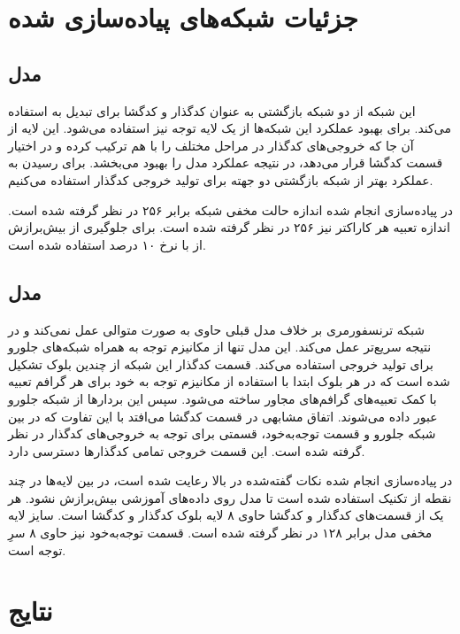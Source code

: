 \documentclass[12pt, a4paper]{book}
\begin{document}
\section*{جزئیات شبکه‌های پیاده‌سازی شده}

\subsection*{مدل }

این شبکه از دو شبکه بازگشتی  به عنوان کدگذار و کدگشا
برای تبدیل  به  استفاده می‌کند.
برای بهبود عملکرد این شبکه‌ها از یک لایه توجه نیز استفاده می‌شود. این لایه از آن جا که خروجی‌های کدگذار‌
در مراحل مختلف را با هم ترکیب کرده و در اختیار قسمت کدگشا قرار می‌دهد، در نتیجه عملکرد مدل را بهبود می‌بخشد.
برای رسیدن به عملکرد بهتر از شبکه بازگشتی دو جهته برای تولید خروجی کدگذار استفاده می‌کنیم.

در پیاده‌سازی انجام شده اندازه حالت مخفی شبکه  برابر ۲۵۶ در نظر گرفته شده است. اندازه
تعبیه هر کاراکتر نیز ۲۵۶ در نظر گرفته شده است. برای جلوگیری از بیش‌برازش از  با نرخ
۱۰ درصد استفاده شده است.

\subsection*{مدل }

شبکه ترنسفورمری بر خلاف مدل قبلی حاوی به صورت متوالی عمل نمی‌کند و در نتیجه سریع‌تر عمل می‌کند.
این مدل تنها از مکانیزم توجه به همراه شبکه‌های جلورو برای تولید خروجی استفاده می‌کند. قسمت کدگذار این
شبکه از چندین بلوک تشکیل شده است که در هر بلوک ابتدا با استفاده از مکانیزم توجه به خود برای هر گرافم
تعبیه با کمک تعبیه‌های گرافم‌های مجاور ساخته می‌شود. سپس این بردار‌ها از شبکه جلو‌رو عبور داده می‌شوند.
اتفاق مشابهی در قسمت کدگشا می‌افتد با این تفاوت که در بین شبکه جلورو و قسمت توجه‌به‌خود، قسمتی برای
توجه به خروجی‌های کدگذار در نظر گرفته شده است. این قسمت خروجی تمامی کدگذار‌ها دسترسی دارد.

در پیاده‌سازی انجام شده نکات گفته‌شده در بالا رعایت شده است، در بین لایه‌ها در چند نقطه از
تکنیک  استفاده شده است تا مدل روی داده‌های آموزشی بیش‌برازش نشود.
هر یک از قسمت‌های کدگذار و کدگشا حاوی ۸ لایه بلوک کدگذار و کدگشا است.
سایز لایه مخفی مدل برابر ۱۲۸ در نظر گرفته شده است. قسمت توجه‌به‌خود نیز حاوی
۸ سرِ توجه است.

\section*{نتایج}
\end{document}
